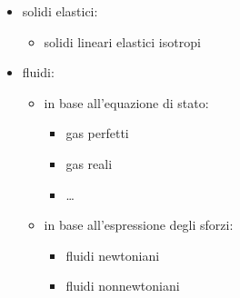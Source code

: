 \documentclass[letterpaper,10pt,english]{jupyterBook}
\begin{document}
\sphinxAtStartPar
{}
\begin{itemize}
\item {} 
\sphinxAtStartPar
solidi elastici:
\begin{itemize}
\item {} 
\sphinxAtStartPar
solidi lineari elastici isotropi

\end{itemize}

\item {} 
\sphinxAtStartPar
fluidi:
\begin{itemize}
\item {} 
\sphinxAtStartPar
in base all’equazione di stato:
\begin{itemize}
\item {} 
\sphinxAtStartPar
gas perfetti

\item {} 
\sphinxAtStartPar
gas reali

\item {} 
\sphinxAtStartPar
…

\end{itemize}

\item {} 
\sphinxAtStartPar
in base all’espressione degli sforzi:
\begin{itemize}
\item {} 
\sphinxAtStartPar
fluidi newtoniani

\item {} 
\sphinxAtStartPar
fluidi non\sphinxhyphen{}newtoniani

\end{itemize}

\end{itemize}

\end{itemize}

\sphinxstepscope
\end{document}
